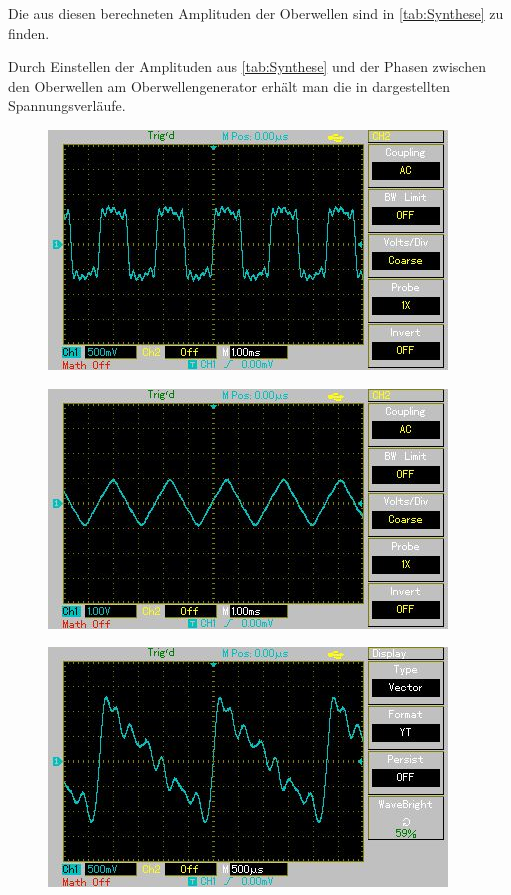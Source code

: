Die aus diesen berechneten Amplituden der Oberwellen sind in \cref{tab:Synthese} zu finden.

%  

Durch Einstellen der Amplituden aus \cref{tab:Synthese} und der Phasen zwischen den Oberwellen am Oberwellengenerator
erhält man die in  dargestellten Spannungsverläufe.

\begin{figure}[h!]
	\centering
	\includegraphics[scale=1.0]{Grafiken/Rechteckspannung.jpg}
	\label{fig:Recht}
\end{figure}

\begin{figure}[h!]
	\centering
	\includegraphics[scale=1.0]{Grafiken/Dreieckspannung.jpg}
	\label{fig:Drei}
\end{figure}

\begin{figure}[h!]
	\centering
	\includegraphics[scale=1.0]{Grafiken/Saegezahnspannung.jpg}
	\label{fig:Säge}
\end{figure}